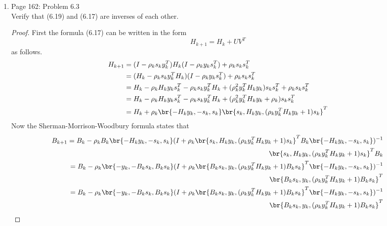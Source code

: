 \documentclass[11pt, oneside]{article}
\begin{document}
\begin{enumerate}
\begin{enumerate}
        \begin{proof}
          Consider the matrix product $\p{\M{D} \M{Q}}^T \M{A} \p{\M{D} \M{Q}}$.
          \begin{align*}
            \p{\M{D} \M{Q}}^T \M{A} \p{\M{D} \M{Q}}^T &= \M{Q}^T \M{D}^T \M{A} \M{D} \M{Q}
            \intertext{Since the columns of $\M{D}$ are $\M{A}$-conjugate}
            &= \M{Q}^T I \M{Q} \\
            &= \M{Q}^T \M{Q} \\
            \intertext{Since $\M{Q}$ is orthogonal}
            &= I
          \end{align*}
          This shows by part (a) that the columns of $\M{D} \M{Q}$ are $\M{A}$-
          conjugate.
        \end{proof}
    \end{enumerate}

  \item %
    Page 162: Problem 6.3 \\
    Verify that (6.19) and (6.17) are inverses of each other.

    \begin{proof}
      First the formula (6.17) can be written in the form
      \[
        H_{k+1} = H_k + UV^T
      \]
      as follows.
      \begin{align*}
        H_{k+1} &= (I - \rho_k s_k y_k^T) H_k (I - \rho_k y_k s_k^T) + \rho_k s_k s_k^T \\
        &= (H_k - \rho_k s_k y_k^T H_k)(I - \rho_k y_k s_k^T) + \rho_k s_k s_k^T \\
        &= H_k - \rho_k H_k y_k s_k^T - \rho_k s_k y_k^T H_k + (\rho_k^2 y_k^T H_k y_k) s_k s_k^T + \rho_k s_k s_k^T \\
        &= H_k - \rho_k H_k y_k s_k^T - \rho_k s_k y_k^T H_k + (\rho_k^2 y_k^T H_k y_k + \rho_k) s_k s_k^T \\
        &= H_k + \rho_k \br{-H_k y_k, -s_k, s_k} \br{s_k, H_k y_k, (\rho_k y_k^T H_k y_k + 1) s_k}^T \\
      \end{align*}
      Now the Sherman-Morrison-Woodbury formula states that
      \begin{align*}
        B_{k+1} = B_k - \rho_k B_k \br{-H_k y_k, -s_k, s_k} (I + \rho_k\br{s_k, H_k y_k, (\rho_k y_k^T H_k y_k + 1) s_k}^T B_k \br{-H_k y_k, -s_k, s_k})^{-1} \\
        \br{s_k, H_k y_k, (\rho_k y_k^T H_k y_k + 1) s_k}^T B_k \\
        = B_k - \rho_k \br{-y_k, -B_k s_k, B_k s_k} (I + \rho_k\br{B_k s_k, y_k, (\rho_k y_k^T H_k y_k + 1) B_k s_k}^T \br{-H_k y_k, -s_k, s_k})^{-1} \\
        \br{B_k s_k, y_k, (\rho_k y_k^T H_k y_k + 1) B_k s_k}^T \\
        = B_k - \rho_k \br{-y_k, -B_k s_k, B_k s_k} (I + \rho_k \br{B_k s_k, y_k, (\rho_k y_k^T H_k y_k + 1) B_k s_k}^T \br{-H_k y_k, -s_k, s_k})^{-1} \\
        \br{B_k s_k, y_k, (\rho_k y_k^T H_k y_k + 1) B_k s_k}^T \\
      \end{align*}
    \end{proof}


\end{enumerate}
\end{document}

